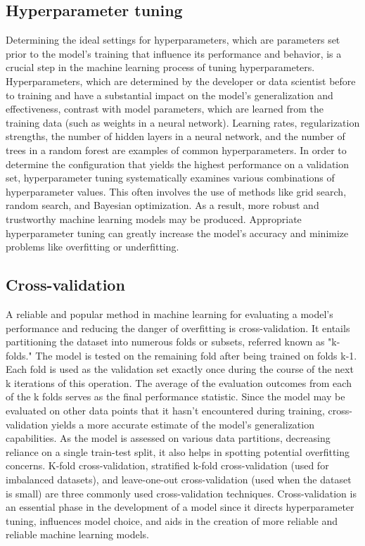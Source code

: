 \documentclass[a4paper,11pt]{report}%
\renewcommand{\\}{\vspace*{0.5\baselineskip} \newline}
\begin{document}
\subsection{Hyperparameter tuning}
Determining the ideal settings for hyperparameters, which are parameters set prior to the model's training that influence its performance and behavior, is a crucial step in the machine learning process of tuning hyperparameters. Hyperparameters, which are determined by the developer or data scientist before to training and have a substantial impact on the model's generalization and effectiveness, contrast with model parameters, which are learned from the training data (such as weights in a neural network). Learning rates, regularization strengths, the number of hidden layers in a neural network, and the number of trees in a random forest are examples of common hyperparameters. In order to determine the configuration that yields the highest performance on a validation set, hyperparameter tuning systematically examines various combinations of hyperparameter values.
This often involves the use of methods like grid search, random search, and Bayesian optimization. As a result, more robust and trustworthy machine learning models may be produced. Appropriate hyperparameter tuning can greatly increase the model's accuracy and minimize problems like overfitting or underfitting.

\subsection{Cross-validation}
A reliable and popular method in machine learning for evaluating a model's performance and reducing the danger of overfitting is cross-validation. It entails partitioning the dataset into numerous folds or subsets, referred known as "k-folds." The model is tested on the remaining fold after being trained on folds k-1. Each fold is used as the validation set exactly once during the course of the next k iterations of this operation. The average of the evaluation outcomes from each of the k folds serves as the final performance statistic. Since the model may be evaluated on other data points that it hasn't encountered during training, cross-validation yields a more accurate estimate of the model's generalization capabilities.
As the model is assessed on various data partitions, decreasing reliance on a single train-test split, it also helps in spotting potential overfitting concerns. K-fold cross-validation, stratified k-fold cross-validation (used for imbalanced datasets), and leave-one-out cross-validation (used when the dataset is small) are three commonly used cross-validation techniques. Cross-validation is an essential phase in the development of a model since it directs hyperparameter tuning, influences model choice, and aids in the creation of more reliable and reliable machine learning models.
\end{document}
